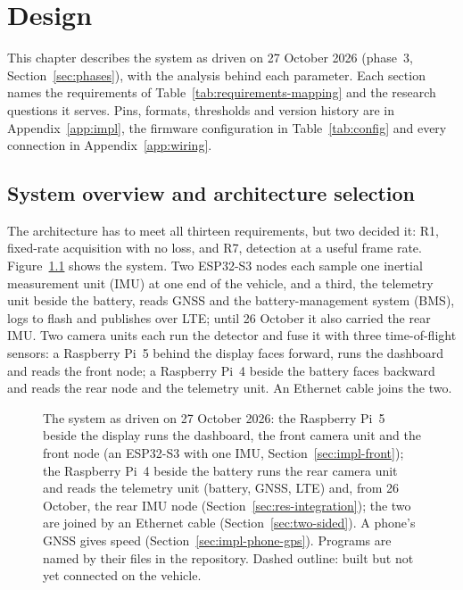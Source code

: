 \chapter{Design}
\label{chap:design}

This chapter describes the system as driven on 27 October 2026 (phase~3, Section~\ref{sec:phases}), with the analysis behind each parameter. Each section names the requirements of Table~\ref{tab:requirements-mapping} and the research questions it serves. Pins, formats, thresholds and version history are in Appendix~\ref{app:impl}, the firmware configuration in Table~\ref{tab:config} and every connection in Appendix~\ref{app:wiring}.

\section{System overview and architecture selection}
\label{sec:architecture}

The architecture has to meet all thirteen requirements, but two decided it: R1, fixed-rate acquisition with no loss, and R7, detection at a useful frame rate. Figure~\ref{fig:system-architecture} shows the system. Two ESP32-S3 nodes each sample one inertial measurement unit (IMU) at one end of the vehicle, and a third, the telemetry unit beside the battery, reads GNSS and the battery-management system (BMS), logs to flash and publishes over LTE; until 26 October it also carried the rear IMU. Two camera units each run the detector and fuse it with three time-of-flight sensors: a Raspberry Pi~5 behind the display faces forward, runs the dashboard and reads the front node; a Raspberry Pi~4 beside the battery faces backward and reads the rear node and the telemetry unit. An Ethernet cable joins the two.

\begin{figure}[htbp]
\centering

\caption[The system as driven on 27 October 2026: the Raspberry Pi~5 beside the display runs the dashboard, the front camera unit and the front node (an ESP32-S3 with one IMU, Section~\ref{sec:impl-front}); the Raspberry Pi~4 beside the battery runs the rear camera unit and reads the telemetry unit (battery, GNSS, LTE) and, from 26 October, the rear IMU node (Section~\ref{sec:res-integration}); the two are joined by an Ethernet cable (Section~\ref{sec:two-sided})]{The system as driven on 27 October 2026: the Raspberry Pi~5 beside the display runs the dashboard, the front camera unit and the front node (an ESP32-S3 with one IMU, Section~\ref{sec:impl-front}); the Raspberry Pi~4 beside the battery runs the rear camera unit and reads the telemetry unit (battery, GNSS, LTE) and, from 26 October, the rear IMU node (Section~\ref{sec:res-integration}); the two are joined by an Ethernet cable (Section~\ref{sec:two-sided}). A phone's GNSS gives speed (Section~\ref{sec:impl-phone-gps}). Programs are named by their files in the repository. Dashed outline: built but not yet connected on the vehicle.}
\label{fig:system-architecture}
\end{figure}

